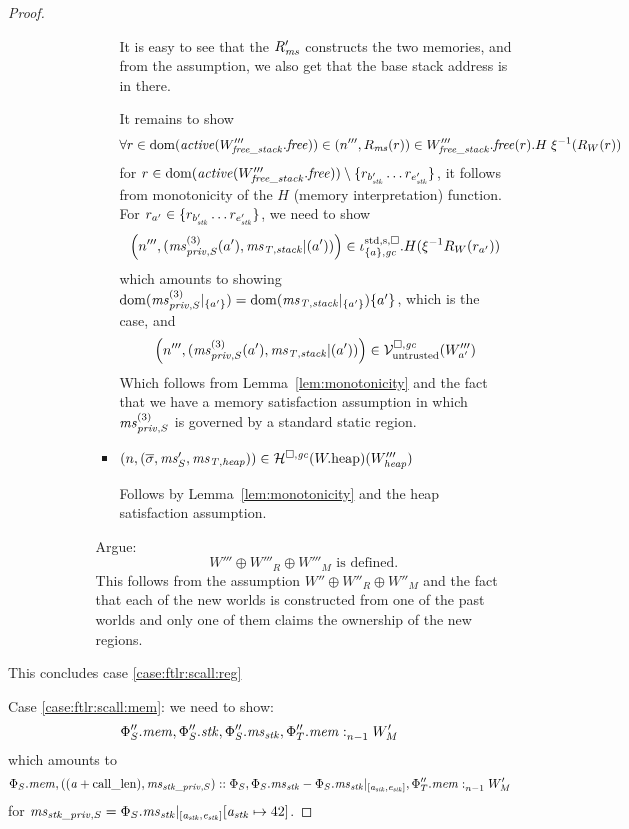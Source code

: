 \begin{proof}
\begin{description}
\begin{itemize}
\begin{itemize}
\begin{itemize}
          It is easy to see that the $R_\ms'$ constructs the two memories, and
          from the assumption, we also get that the base stack address is in there.

          It remains to show
          \[
            \forall r \in \dom(\activeReg{W_{\var{free\_stack}}'''.\free}) \in \npair[n''']{R_\ms(r)} \in W_{\var{free\_stack}}'''.\free(r).H \; \xi^{-1}(R_W(r))
          \]
          for $r \in \dom(\activeReg{W_{\var{free\_stack}}'''.\free}) \setminus \{r_{b_\stk'}\dots r_{e_\stk'}\}$, it follows from monotonicity of the $H$ (memory interpretation) function.
          For $r_{a'} \in \{r_{b_\stk'}\dots r_{e_\stk'}\}$, we need to show
          \[
            \npair[n''']{(\ms_{\priv,S}^{(3)}(a') , \ms_\var{T,stack}|(a'))} \in \stdreg{\{a\},\gc}{\spa}.H (\xi^{-1}R_W(r_{a'}))
          \]
          which amounts to showing $\dom(\ms_{\priv,S}^{(3)}|_{\{a'\}}) = \dom(\ms_\var{T,stack}|_{\{a'\}}) \{a'\}$, which is the case, and
          \[
            \npair[n''']{(\ms_{\priv,S}^{(3)}(a') , \ms_\var{T,stack}|(a'))} \in \lrv (W_{a'}''')
          \]
          Which follows from Lemma~\ref{lem:monotonicity} and the fact that we have a memory satisfaction assumption in which $\ms_{\priv,S}^{(3)}$ is governed by a standard static region.

        \item $\npair{(\overline{\sigma},\ms_S',\ms_\var{T,heap})} \in \lrheap(\pwheap)(W_{\var{heap}}''')$

          Follows by Lemma~\ref{lem:monotonicity} and the heap satisfaction assumption.
        \end{itemize}

        Argue:
        \[
          W''' \oplus W'''_R \oplus W'''_M \text{ is defined.}
        \]
        This follows from the assumption $W'' \oplus W''_R \oplus W''_M$ and the fact that each of the new worlds is constructed from one of the past worlds and only one of them claims the ownership of the new regions.
      \end{itemize}
    \end{itemize}


\end{description}
This concludes case \ref{case:ftlr:scall:reg}

  Case \ref{case:ftlr:scall:mem}:
  we need to show:
  \[
    \memSat[n-1]{\Phi_S''.\mem,\Phi_S''.\stk,\Phi_S''.\ms_\stk,\Phi_T''.\mem}{W_M'}
  \]
  which amounts to
  \[
    \memSat[n-1]{\Phi_S.\mem,((\aaddr+\calllen),\ms_{\stk\_\priv,S}) :: \Phi_S,\Phi_S.\ms_\stk - \Phi_S.\ms_\stk|_{[\aaddr_\stk,\eaddr_\stk]},\Phi_T''.\mem}{W_M'}
  \]
  for $\ms_{\stk\_\priv,S} = \Phi_S.\ms_\stk |_{[\aaddr_\stk,\eaddr_\stk]}\update{\aaddr_\stk}{42}$.


\end{proof}
